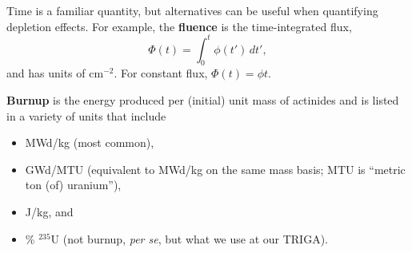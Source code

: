 \documentclass[compact]{ne630handout}
\begin{document}

Time is a familiar quantity, but alternatives can be useful when quantifying
depletion effects. For example, the \textbf{fluence} is the time-integrated flux,
\begin{equation*}
 \Phi(t)=\int_0^t\phi(t')\,dt',
 \tag{FNRP 10.32}
\end{equation*}
and has units of $\mathrm{cm}^{-2}$. For constant flux, $\Phi(t)=\phi t$.

\vspace{5pt}

\textbf{Burnup} is the energy produced per (initial) unit mass of actinides
and is listed in a variety of units that include
\begin{itemize}\setlength{\itemsep}{1pt}\setlength{\parsep}{0pt}
 \item MWd/kg (most common),
 \item GWd/MTU (equivalent to MWd/kg on the same mass basis; MTU is
 ``metric ton (of) uranium''),
 \item J/kg, and
 \item \% ${}^{235}$U (not burnup, \emph{per se}, but what we use at our TRIGA).
\end{itemize}
\colend
\end{document}
